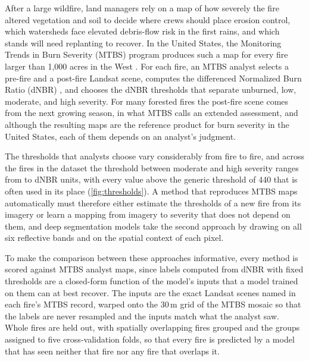 \documentclass[10pt]{article}
\begin{document}
After a large wildfire, land managers rely on a map of how severely the fire altered vegetation and soil to decide where crews should place erosion control, which watersheds face elevated debris-flow risk in the first rains, and which stands will need replanting to recover.
In the United States, the Monitoring Trends in Burn Severity (MTBS) program produces such a map for every fire larger than 1{,}000 acres in the West \citep{eidenshink2007mtbs}.
For each fire, an MTBS analyst selects a pre-fire and a post-fire Landsat scene, computes the differenced Normalized Burn Ratio (dNBR) \citep{key2006landscape}, and chooses the dNBR thresholds that separate unburned, low, moderate, and high severity.
For many forested fires the post-fire scene comes from the next growing season, in what MTBS calls an extended assessment, and although the resulting maps are the reference product for burn severity in the United States, each of them depends on an analyst's judgment.

The thresholds that analysts choose vary considerably from fire to fire, and across the \mFires{} fires in the dataset the threshold between moderate and high severity ranges from \mHighMin{} to \mHighMax{} dNBR units, with every value above the generic threshold of 440 that is often used in its place (\cref{fig:thresholds}).
A method that reproduces MTBS maps automatically must therefore either estimate the thresholds of a new fire from its imagery or learn a mapping from imagery to severity that does not depend on them, and deep segmentation models take the second approach by drawing on all six reflective bands and on the spatial context of each pixel.

To make the comparison between these approaches informative, every method is scored against MTBS analyst maps, since labels computed from dNBR with fixed thresholds are a closed-form function of the model's inputs that a model trained on them can at best recover.
The inputs are the exact Landsat scenes named in each fire's MTBS record, warped onto the 30\,m grid of the MTBS mosaic so that the labels are never resampled and the inputs match what the analyst saw.
Whole fires are held out, with spatially overlapping fires grouped and the groups assigned to five cross-validation folds, so that every fire is predicted by a model that has seen neither that fire nor any fire that overlaps it.
\end{document}
